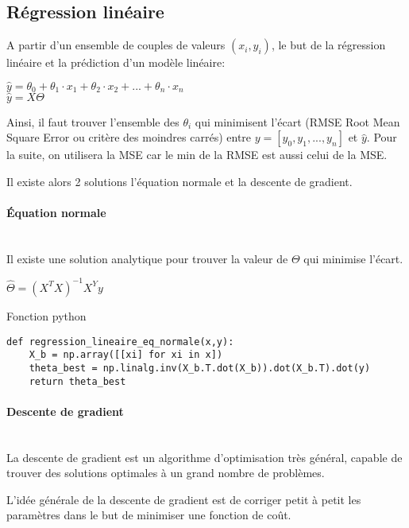 \subsection{Régression linéaire}

A partir d'un ensemble de couples de valeurs $(x_i,y_i)$, le but de la régression linéaire et la prédiction d'un modèle linéaire: \\
\begin{center}
$\hat{y}=\theta_0+\theta_1\cdot x_1+\theta_2\cdot x_2+...+\theta_n\cdot x_n$ \\
$\hat{y}=X \Theta$
\end{center}

Ainsi, il faut trouver l'ensemble des $\theta_i$ qui minimisent l'écart (RMSE Root Mean Square Error ou critère des moindres carrés) entre $y=[y_0, y_1,...,y_n]$ et $\hat{y}$. Pour la suite, on utilisera la MSE car le min de la RMSE est aussi celui de la MSE.

Il existe alors 2 solutions l'équation normale et la descente de gradient.

\paragraph{Équation normale} ~\ \\

Il existe une solution analytique pour trouver la valeur de $\Theta$ qui minimise l'écart.
\begin{center}
$\hat{\Theta}=(X^TX)^{-1}X^Yy$
\end{center}

Fonction python
\begin{lstlisting}
def regression_lineaire_eq_normale(x,y):
    X_b = np.array([[xi] for xi in x])
    theta_best = np.linalg.inv(X_b.T.dot(X_b)).dot(X_b.T).dot(y)
    return theta_best
\end{lstlisting}

\paragraph{Descente de gradient} ~\ \\

La descente de gradient est un algorithme d'optimisation très général, capable de trouver des solutions optimales à un grand nombre de problèmes. 

L'idée générale de la descente de gradient est de corriger petit à petit les paramètres dans le but de minimiser une fonction de coût.

